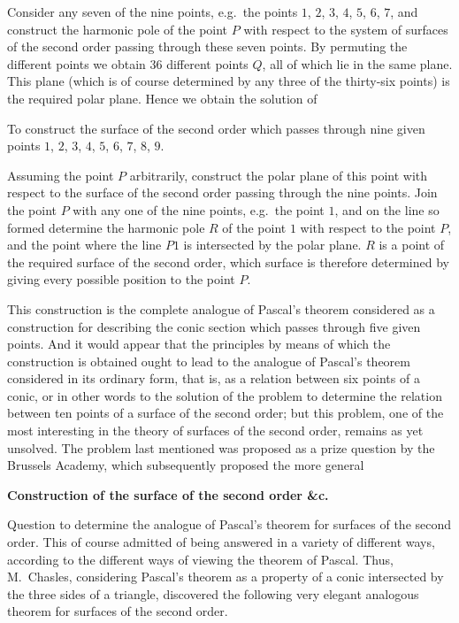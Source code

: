 \documentclass[11pt,a4paper]{book}
\begin{document}
Consider any seven of the nine points, e.g.\ the points $1$, $2$, $3$, $4$, $5$, $6$, $7$, and construct the harmonic pole of the point $P$ with respect to the system of surfaces of the second order passing through these seven points. By permuting the different points we obtain $36$ different points $Q$, all of which lie in the same plane. This plane (which is of course determined by any three of the thirty-six points) is the required polar plane. Hence we obtain the solution of

\begin{problem}
To construct the surface of the second order which passes through nine given points $1$, $2$, $3$, $4$, $5$, $6$, $7$, $8$, $9$.
\end{problem}

Assuming the point $P$ arbitrarily, construct the polar plane of this point with respect to the surface of the second order passing through the nine points. Join the point $P$ with any one of the nine points, e.g.\ the point $1$, and on the line so formed determine the harmonic pole $R$ of the point $1$ with respect to the point $P$, and the point where the line $P1$ is intersected by the polar plane. $R$ is a point of the required surface of the second order, which surface is therefore determined by giving every possible position to the point $P$.

This construction is the complete analogue of Pascal's theorem considered as a construction for describing the conic section which passes through five given points. And it would appear that the principles by means of which the construction is obtained ought to lead to the analogue of Pascal's theorem considered in its ordinary form, that is, as a relation between six points of a conic, or in other words to the solution of the problem to determine the relation between ten points of a surface of the second order; but this problem, one of the most interesting in the theory of surfaces of the second order, remains as yet unsolved. The problem last mentioned was proposed as a prize question by the Brussels Academy, which subsequently proposed the more general

\newpage

\setcounter{page}{427}

\begin{center}
\textbf{Construction of the surface of the second order \&c.}
\end{center}

Question to determine the analogue of Pascal's theorem for surfaces of the second order. This of course admitted of being answered in a variety of different ways, according to the different ways of viewing the theorem of Pascal. Thus, M.~Chasles, considering Pascal's theorem as a property of a conic intersected by the three sides of a triangle, discovered the following very elegant analogous theorem for surfaces of the second order.
\end{document}
